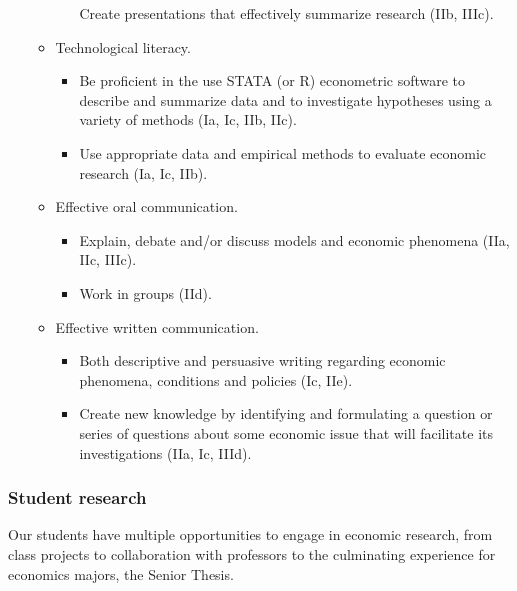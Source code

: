 \documentclass[12pt]{article}
\theoremstyle{plain}
\theoremstyle{plain}
\theoremstyle{plain}
\theoremstyle{plain}
\theoremstyle{plain}
\theoremstyle{plain}
\begin{document}
\begin{enumerate}
\begin{itemize}
\begin{itemize}
Create presentations that effectively summarize research (IIb, IIIc).
\end{itemize}
\item Technological literacy.
\begin{itemize}
\item Be proficient in the use STATA (or R) econometric software to describe and summarize data and to investigate hypotheses using a variety of methods (Ia, Ic, IIb, IIc).
\item Use appropriate data and empirical methods to evaluate economic research (Ia, Ic, IIb).
\end{itemize}
\item Effective oral communication.
\begin{itemize}
\item Explain, debate and/or discuss models and economic phenomena (IIa, IIc, IIIc).
\item Work in groups (IId).
\end{itemize}
\item Effective written communication.
\begin{itemize}
\item Both descriptive and persuasive writing regarding economic phenomena, conditions and policies (Ic, IIe).
\item Create new knowledge by identifying and formulating a question or series of questions about some economic issue that will facilitate its investigations (IIa, Ic, IIId).
\end{itemize}
\end{itemize}
\end{enumerate}




\subsubsection{Student research}
\label{sec:orgc3e53de}
Our students have multiple opportunities to engage in economic research,
from class projects to collaboration with professors to the culminating experience for economics majors,
the Senior Thesis. 
\end{document}
